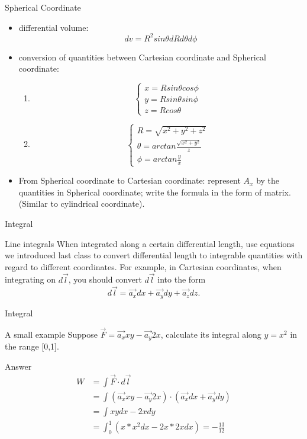 \documentclass[xcolor={dvipsnames}]{beamer}
\begin{document}
\begin{frame}{Spherical Coordinate}
\begin{itemize}
    \item differential volume: 
    $$
    dv = R^2 sin\theta dR d\theta d\phi
    $$
    \item conversion of quantities between Cartesian coordinate and Spherical coordinate:
    \begin{enumerate}
        \item
        $$
        \begin{cases}
            x = Rsin\theta cos\phi\\
            y = Rsin\theta sin\phi\\
            z = Rcos\theta
        \end{cases}
        $$
        \item
        $$
        \begin{cases}
            R=\sqrt{x^2+y^2+z^2}\\
            \theta = arctan\frac{\sqrt{x^2+y^2}}{z}\\
            \phi = arctan\frac{y}{x}
        \end{cases}
        $$
    \end{enumerate}
    \item From Spherical coordinate to Cartesian coordinate: represent $A_x$ by the quantities in Spherical coordinate; write the formula in the form of matrix. (Similar to cylindrical coordinate).
\end{itemize}
\end{frame}
\begin{frame}{Integral}
\begin{block}{Line integrals}
When integrated along a certain differential length, use equations we introduced last class to convert differential length to integrable quantities with regard to different coordinates. For example, in Cartesian coordinates, when integrating on $d\vec{l}$, you should convert $d\vec{l}$ into the form
$$d\vec{l} = \vec{a_x}dx + \vec{a_y}dy + \vec{a_z}dz.$$
\end{block}
\end{frame}
\begin{frame}{Integral}
\begin{block}{A small example}
Suppose $\vec{F}=\vec{a_x}xy - \vec{a_y}2x$, calculate its integral along $y=x^2$ in the range [0,1].
\end{block}
\pause 
\begin{block}{Answer}
\[
\begin{aligned}
W&=\int \vec{F}\cdot d\vec{l}\\
&=\int (\vec{a_x}xy - \vec{a_y}2x)\cdot (\vec{a_x}dx + \vec{a_y}dy)\\
&=\int xydx-2xdy\\
&=\int_0^1 (x*x^2dx-2x*2xdx)=-\frac{13}{12}\\
\end{aligned}
\]
\end{block}
\end{frame}
\end{document}

